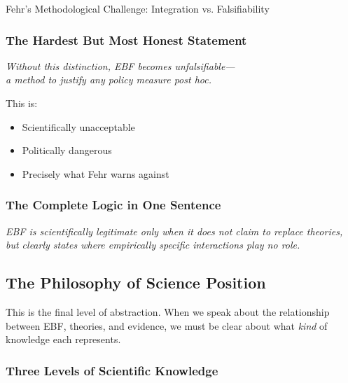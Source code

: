\begin{chapter}{Fehr's Methodological Challenge: Integration vs. Falsifiability}
\subsubsection{The Hardest But Most Honest Statement}

\begin{tcolorbox}[colback=red!10!white,colframe=red!75!black,title=\textbf{Final Warning}]
\begin{center}
\large
\textit{Without this distinction, EBF becomes unfalsifiable---\\
a method to justify any policy measure post hoc.}
\end{center}

\vspace{0.5em}
This is:
\begin{itemize}[noitemsep]
    \item Scientifically unacceptable
    \item Politically dangerous
    \item Precisely what Fehr warns against
\end{itemize}
\end{tcolorbox}

\subsubsection{The Complete Logic in One Sentence}

\begin{tcolorbox}[colback=blue!5!white,colframe=blue!75!black]
\textit{EBF is scientifically legitimate only when it does not claim to replace theories, but clearly states where empirically specific interactions play no role.}
\end{tcolorbox}


\subsection{The Philosophy of Science Position}
\label{sec:philosophy-position}

This is the final level of abstraction. When we speak about the relationship between EBF, theories, and evidence, we must be clear about what \textit{kind} of knowledge each represents.

\subsubsection{Three Levels of Scientific Knowledge}


\end{chapter}
